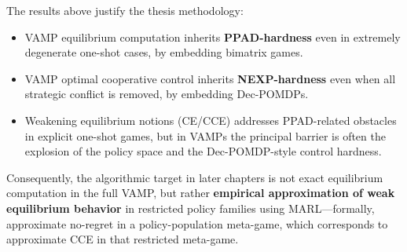 The results above justify the thesis methodology:
\begin{itemize}
\item VAMP equilibrium computation inherits \textbf{PPAD-hardness} even in extremely degenerate one-shot cases, by embedding bimatrix games.
\item VAMP optimal cooperative control inherits \textbf{NEXP-hardness} even when all strategic conflict is removed, by embedding Dec-POMDPs.
\item Weakening equilibrium notions (CE/CCE) addresses PPAD-related obstacles in explicit one-shot games, but in VAMPs the principal barrier is often the explosion of the policy space and the Dec-POMDP-style control hardness.
\end{itemize}

Consequently, the algorithmic target in later chapters is not exact equilibrium computation in the full VAMP, but rather \textbf{empirical approximation of weak equilibrium behavior} in restricted policy families using MARL---formally, approximate no-regret in a policy-population meta-game, which corresponds to approximate CCE in that restricted meta-game.
